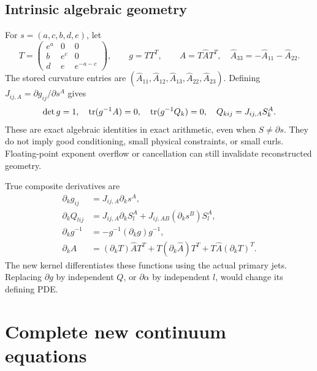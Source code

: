 \documentclass[11pt,letterpaper]{article}
\begin{document}
\subsection{Intrinsic algebraic geometry}
For $s=(a,c,b,d,e)$, let
\begin{equation}
T=\begin{pmatrix}e^a&0&0\\b&e^c&0\\d&e&e^{-a-c}\end{pmatrix},\qquad
 g=TT^T,\qquad A=T\widehat A T^T,\quad
 \widehat A_{33}=-\widehat A_{11}-\widehat A_{22}.
\end{equation}
The stored curvature entries are $(\widehat A_{11},\widehat A_{12},\widehat A_{13},\widehat A_{22},\widehat A_{23})$. Defining $J_{ij,A}=\partial g_{ij}/\partial s^A$ gives
\begin{equation}
\det g=1,\quad \operatorname{tr}(g^{-1}A)=0,\quad \operatorname{tr}(g^{-1}Q_k)=0,\quad Q_{kij}=J_{ij,A}S_k^A.
\end{equation}
These are exact algebraic identities in exact arithmetic, even when $S\ne\partial s$. They do not imply good conditioning, small physical constraints, or small curls. Floating-point exponent overflow or cancellation can still invalidate reconstructed geometry.

True composite derivatives are
\begin{align}
\partial_k g_{ij}&=J_{ij,A}\partial_k s^A,\\
\partial_k Q_{lij}&=J_{ij,A}\partial_k S_l^A+J_{ij,AB}(\partial_k s^B)S_l^A,\\
\partial_k g^{-1}&=-g^{-1}(\partial_k g)g^{-1},\\
\partial_k A&=(\partial_kT)\widehat AT^T+T(\partial_k\widehat A)T^T+T\widehat A(\partial_kT)^T.
\end{align}
The new kernel differentiates these functions using the actual primary jets. Replacing $\partial g$ by independent $Q$, or $\partial\alpha$ by independent $l$, would change its defining PDE.

\section{Complete new continuum equations}
\end{document}
